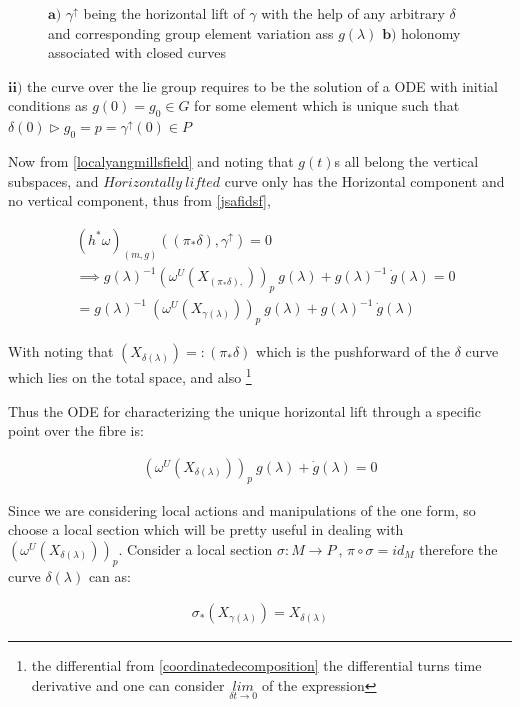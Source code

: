 \documentclass[8pt, twocoloumn]{article}
\begin{document}
\begin{figure}[h!]{\label{fig: hdhfjfdihfhdf}}
\begin{center}
\caption{$\textbf{a)}$ $\gamma^{\uparrow}$ being the horizontal lift of $\gamma$ with the help of any arbitrary $\delta$ and corresponding group element variation ass $g(\lambda)$ 
$\textbf{b)}$  holonomy associated with closed curves} 
\end{center}
\end{figure}

$\textbf{ii)}$ the curve over the lie group requires to be the solution of a ODE with initial conditions as $g(0) = g_0 \in G$ for some element which is unique such that $\delta(0) \vartriangleright g_0 = p = \gamma^{\uparrow}(0)\in P $

Now from \ref{localyangmillsfield} and noting that $g(t)$s all belong the vertical subspaces, and $Horizontally \ lifted$ curve only has the Horizontal component and no vertical component, thus from \ref{jsafidsf}, 

\begin{align}
    & {(h^{*}\omega)}_{(m,g)}(({\pi}_{*}\delta), \gamma^{\uparrow}) = 0 \\
    & \implies {g(\lambda)}^{-1} {(\omega^{U}(X_{({\pi}_{*}\delta),}))}_{p} \ g(\lambda)+ {g(\lambda)}^{-1} \ \dot{g}(\lambda) = 0 \\
    & = {g(\lambda)}^{-1} \  {(\omega^{U}(X_{\gamma(\lambda)}))}_{p} \ g(\lambda)+ {g(\lambda)}^{-1} \ \dot{g}(\lambda)
\end{align}

With noting that $(X_{\delta(\lambda)}) =: ({\pi}_{*}\delta)$ which is the pushforward of the $\delta$ curve which lies on the total space, and also \footnote{the differential from \ref{coordinatedecomposition} the differential turns time derivative and one can consider $\underset{\delta t \to 0}{lim}$ of the expression}

Thus the ODE for characterizing the unique horizontal lift through a specific point over the fibre is:

\begin{align}
    {(\omega^{U}(X_{\delta(\lambda)}))}_{p} \ g(\lambda)+ \dot{g}(\lambda) = 0
\end{align}

Since we are considering local actions and manipulations of the one form, so choose a local section which will be pretty useful in dealing with $ {(\omega^{U}(X_{\delta(\lambda)}))}_{p}$. Consider a local section $\sigma : M \to P \ $, $ \pi \circ \sigma = id_M$ therefore the curve $\delta(\lambda)$ can as:

\begin{align}
    \sigma_{*}(X_{\gamma(\lambda)}) = X_{\delta(\lambda)}
\end{align}
\end{document}
